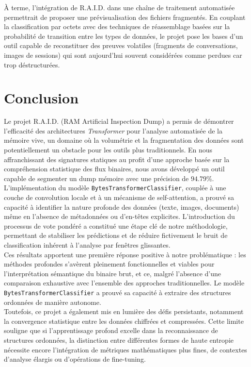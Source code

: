 \documentclass[12pt]{report}
\begin{document}
    À terme, l'intégration de R.A.I.D. dans une chaîne de traitement automatisée permettrait de proposer une prévisualisation des fichiers fragmentés. En couplant la classification par octets avec des techniques de réassemblage basées sur la probabilité de transition entre les types de données, le projet pose les bases d'un outil capable de reconstituer des preuves volatiles (fragments de conversations, images de sessions) qui sont aujourd'hui souvent considérées comme perdues car trop déstructurées.

    \chapter{Conclusion}\label{chap:conclusion}
    Le projet R.A.I.D. (RAM Artificial Inspection Dump) a permis de démontrer l'efficacité des architectures \textit{Transformer} pour l'analyse automatisée de la mémoire vive, un domaine où la volumétrie et la fragmentation des données sont potentiellement un obstacle pour les outils plus traditionnels. En nous affranchissant des signatures statiques au profit d'une approche basée sur la compréhension statistique des flux binaires, nous avons développé un outil capable de segmenter un dump mémoire avec une précision de $94.79\%$.\\

    L'implémentation du modèle \texttt{BytesTransformerClassifier}, couplée à une couche de convolution locale et à un mécanisme de self-attention, a prouvé sa capacité à identifier la nature profonde des données (texte, images, documents) même en l'absence de métadonnées ou d'en-têtes explicites. L'introduction du processus de vote pondéré a constitué une étape clé de notre méthodologie, permettant de stabiliser les prédictions et de réduire fictivement le bruit de classification inhérent à l'analyse par fenêtres glissantes.\\

    Ces résultats apportent une première réponse positive à notre problématique : les méthodes profondes s'avèrent pleinement fonctionnelles et viables pour l'interprétation sémantique du binaire brut, et ce, malgré l'absence d'une comparaison exhaustive avec l'ensemble des approches traditionnelles. Le modèle \texttt{BytesTransformerClassifier} a prouvé sa capacité à extraire des structures ordonnées de manière autonome.\\

    Toutefois, ce projet a également mis en lumière des défis persistants, notamment la convergence statistique entre les données chiffrées et compressées. Cette limite souligne que si l'apprentissage profond excelle dans la reconnaissance de structures ordonnées, la distinction entre différentes formes de haute entropie nécessite encore l'intégration de métriques mathématiques plus fines, de contextes d'analyse élargis ou d'opérations de fine-tuning.\\
\end{document}
